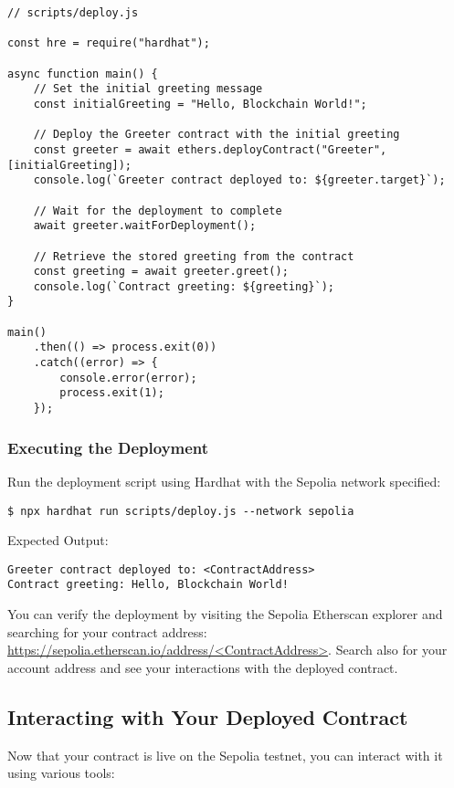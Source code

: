 \documentclass[12pt]{article}
\begin{document}
\begin{verbatim}
// scripts/deploy.js

const hre = require("hardhat");

async function main() {
    // Set the initial greeting message
    const initialGreeting = "Hello, Blockchain World!";
    
    // Deploy the Greeter contract with the initial greeting
    const greeter = await ethers.deployContract("Greeter", [initialGreeting]);
    console.log(`Greeter contract deployed to: ${greeter.target}`);

    // Wait for the deployment to complete
    await greeter.waitForDeployment();

    // Retrieve the stored greeting from the contract
    const greeting = await greeter.greet();
    console.log(`Contract greeting: ${greeting}`);
}

main()
    .then(() => process.exit(0))
    .catch((error) => {
        console.error(error);
        process.exit(1);
    });
\end{verbatim}

\subsubsection{Executing the Deployment}

Run the deployment script using Hardhat with the Sepolia network specified:

\begin{verbatim}
$ npx hardhat run scripts/deploy.js --network sepolia
\end{verbatim}
Expected Output:
\begin{verbatim}
Greeter contract deployed to: <ContractAddress>
Contract greeting: Hello, Blockchain World!
\end{verbatim}
You can verify the deployment by visiting the Sepolia Etherscan explorer and searching for your contract address: \url{https://sepolia.etherscan.io/address/<ContractAddress>}. Search also for your account address and see your interactions with the deployed contract.

\subsection{Interacting with Your Deployed Contract}

Now that your contract is live on the Sepolia testnet, you can interact with it using various tools:
\end{document}
